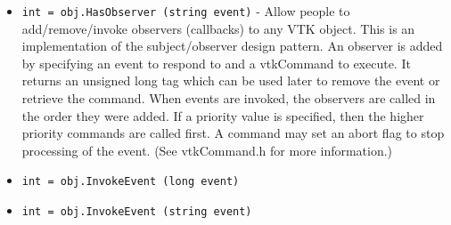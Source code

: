 \begin{itemize}
\item  \verb|int = obj.HasObserver (string event)| -  Allow people to add/remove/invoke observers (callbacks) to any VTK
 object.  This is an implementation of the subject/observer design
 pattern. An observer is added by specifying an event to respond to
 and a vtkCommand to execute. It returns an unsigned long tag which
 can be used later to remove the event or retrieve the command.
 When events are invoked, the observers are called in the order they
 were added. If a priority value is specified, then the higher 
 priority commands are called first. A command may set an abort
 flag to stop processing of the event. (See vtkCommand.h for more
 information.)

\item  \verb|int = obj.InvokeEvent (long event)|

\item  \verb|int = obj.InvokeEvent (string event)|

\end{itemize}
